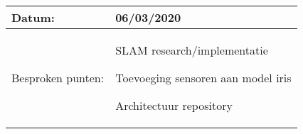 \begin{tabularx}{\textwidth}{| l | X |}
  \hline
  Datum: & 06/03/2020\\
  \hline
  Besproken punten: &
  \begin{compactitem}
    \item SLAM research/implementatie
    \item Toevoeging sensoren aan model iris
    \item Architectuur repository
  \end{compactitem}\\
  \hline
\end{tabularx}